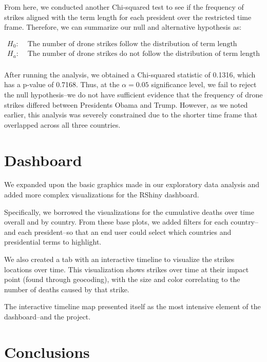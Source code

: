 \documentclass[
]{article}
\begin{document}
From here, we conducted another Chi-squared test to see if the frequency
of strikes aligned with the term length for each president over the
restricted time frame. Therefore, we can summarize our null and
alternative hypothesis as:

\[
\begin{aligned}
H_0: & \text{ The number of drone strikes follow the distribution of term length} \\
H_a: & \text{ The number of drone strikes do not follow the distribution of term length} \\
\end{aligned}
\]

After running the analysis, we obtained a Chi-squared statistic of
0.1316, which has a p-value of 0.7168. Thus, at the \(\alpha = 0.05\)
significance level, we fail to reject the null hypothesis--we do not
have sufficient evidence that the frequency of drone strikes differed
between Presidents Obama and Trump. However, as we noted earlier, this
analysis was severely constrained due to the shorter time frame that
overlapped across all three countries.

\hypertarget{dashboard}{%
\section{Dashboard}\label{dashboard}}

We expanded upon the basic graphics made in our exploratory data
analysis and added more complex visualizations for the RShiny dashboard.

Specifically, we borrowed the visualizations for the cumulative deaths
over time overall and by country. From these base plots, we added
filters for each country--and each president--so that an end user could
select which countries and presidential terms to highlight.

We also created a tab with an interactive timeline to visualize the
strikes locations over time. This visualization shows strikes over time
at their impact point (found through geocoding), with the size and color
correlating to the number of deaths caused by that strike.

The interactive timeline map presented itself as the most intensive
element of the dashboard--and the project.

\hypertarget{conclusions}{%
\section{Conclusions}\label{conclusions}}
\end{document}
